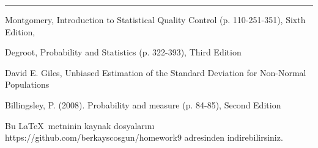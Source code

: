 
\renewcommand{\refname}{}

\begin{thebibliography}{}
	
	\hrule\vspace{0.5cm}
	
	 Montgomery, Introduction to Statistical Quality Control (p. 110-251-351), Sixth Edition,
	
	 Degroot, Probability and Statistics (p. 322-393), Third Edition
	
	 David E. Giles, Unbiased Estimation of the Standard Deviation for Non-Normal Populations
	
	 Billingsley, P. (2008). Probability and measure (p. 84-85), Second Edition
\end{thebibliography}

Bu \LaTeX\ metninin kaynak dosyalarını https://github.com/berkayscosgun/homework9 adresinden indirebilirsiniz.

